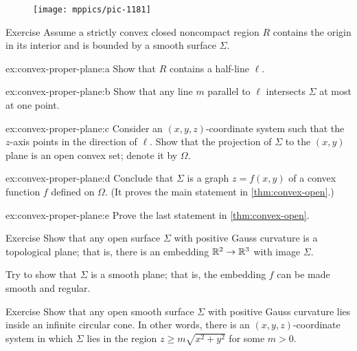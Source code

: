 {\begin{wrapfigure}{r}{33 mm}
\vskip-8mm
\centering
\texttt{[image: mppics/pic-1181]}
\end{wrapfigure}


\begin{thm}{Exercise}\label{ex:convex-proper-plane}
Assume a strictly convex closed noncompact region $R$ contains the origin in its interior and is bounded by a smooth surface $\Sigma$.

\begin{subthm}{ex:convex-proper-plane:a}
Show that $R$ contains a half-line $\ell$.
\end{subthm}

\begin{subthm}{ex:convex-proper-plane:b}
Show that any line $m$ parallel to $\ell$ intersects $\Sigma$ at most at one point.
\end{subthm}


\begin{subthm}{ex:convex-proper-plane:c}
Consider an $(x,y,z)$-coordinate system such that the $z$-axis points in the direction of $\ell$.
Show that the projection of $\Sigma$ to the $(x,y)$ plane is an open convex set; denote it by $\Omega$.
\end{subthm}

\begin{subthm}{ex:convex-proper-plane:d}
Conclude that $\Sigma$ is a graph $z=f(x,y)$ of a convex function $f$ defined on $\Omega$.
(It proves the main statement in \ref{thm:convex-open}.)
\end{subthm}

\begin{subthm}{ex:convex-proper-plane:e}
Prove the last statement in \ref{thm:convex-open}.
\end{subthm}


\end{thm}



}

\begin{thm}{Exercise}\label{ex:open+convex=plane}
Show that any open surface $\Sigma$ with positive Gauss curvature is a topological plane;
that is, there is an embedding $\mathbb{R}^2\to\mathbb{R}^3$ with image $\Sigma$.

Try to show that $\Sigma$ is a smooth plane; that is, the embedding $f$ can be made smooth and regular.
\end{thm}

\begin{thm}{Exercise}\label{ex:circular-cone}
Show that any open smooth surface $\Sigma$ with positive Gauss curvature
lies inside an infinite circular cone. In other words, there is an $(x,y,z)$-coordinate system in which $\Sigma$ lies in the region $z \geq m \sqrt{x^2 + y^2}$ for some $m > 0$.
\end{thm} 

